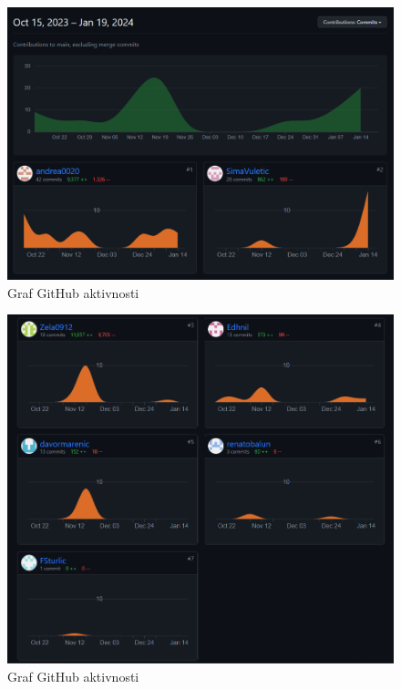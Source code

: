 		\begin{figure}[H]
			\includegraphics[width=\textwidth]{slike/d1.PNG} %
			\centering
			\caption{Graf GitHub aktivnosti}
			\label{fig:d1}
		\end{figure}
		
		\begin{figure}[H]
			\includegraphics[width=\textwidth]{slike/d2.PNG} %
			\centering
			\caption{Graf GitHub aktivnosti}
			\label{fig:d2}
		\end{figure}
		
		\eject
		
	